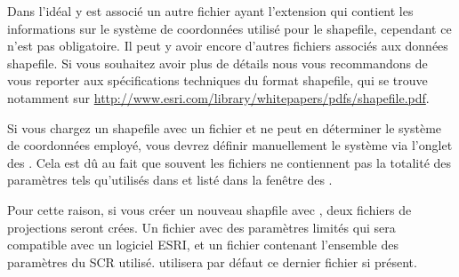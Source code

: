 Dans l'idéal y est associé un autre fichier ayant l'extension  
qui contient les informations sur le système de coordonnées utilisé pour le 
shapefile, cependant ce n'est pas obligatoire. Il peut y avoir encore d'autres 
fichiers associés aux données shapefile. Si vous souhaitez avoir plus de détails 
nous vous recommandons de vous reporter aux spécifications techniques du format shapefile, qui se trouve notamment sur \url{http://www.esri.com/library/whitepapers/pdfs/shapefile.pdf}.



Si vous chargez un shapefile avec un fichier  et \qg ne peut en 
déterminer le système de coordonnées employé, vous devrez définir manuellement 
le système via l'onglet  des . 
Cela est dû au fait que souvent les fichiers  ne contiennent 
pas la totalité des paramètres tels qu'utilisés dans \qg et listé dans la 
fenêtre des .

Pour cette raison, si vous créer un nouveau shapfile avec \qg, deux fichiers de 
projections seront crées. Un fichier  avec des paramètres limités 
qui sera compatible avec un logiciel ESRI, et un fichier  contenant 
l'ensemble des paramètres du SCR utilisé. \qg utilisera par défaut ce dernier 
fichier si présent.

